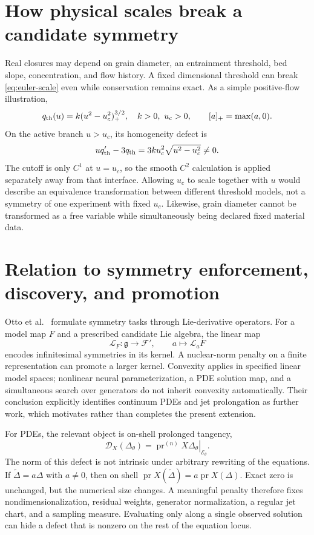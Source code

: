 \documentclass[11pt,a4paper,oneside]{report}
\numberwithin{equation}{chapter}
\newcommand{\E}{\mathcal E}
\newcommand{\pr}{\operatorname{pr}}
\begin{document}
\section{How physical scales break a candidate symmetry}
Real closures may depend on grain diameter, an entrainment threshold, bed slope, concentration, and flow history. A fixed dimensional threshold can break \eqref{eq:euler-scale} even while conservation remains exact. As a simple positive-flow illustration,
\begin{equation}\label{eq:threshold}
q_{\rm th}(u)=k(u^2-u_c^2)_+^{3/2},\quad k>0,\ u_c>0,
\qquad [a]_+=\max(a,0).
\end{equation}
On the active branch $u>u_c$, its homogeneity defect is
\begin{equation}
uq_{\rm th}'-3q_{\rm th}=3ku_c^2\sqrt{u^2-u_c^2}\ne0.
\end{equation}
The cutoff is only $C^1$ at $u=u_c$, so the smooth $C^2$ calculation is applied separately away from that interface. Allowing $u_c$ to scale together with $u$ would describe an equivalence transformation between different threshold models, not a symmetry of one experiment with fixed $u_c$. Likewise, grain diameter cannot be transformed as a free variable while simultaneously being declared fixed material data.

\section{Relation to symmetry enforcement, discovery, and promotion}
Otto et al.\ \cite{otto} formulate symmetry tasks through Lie-derivative operators. For a model map $F$ and a prescribed candidate Lie algebra, the linear map
\begin{equation}
\mathcal L_F:\mathfrak g\to\mathcal F',\qquad a\mapsto\mathcal L_aF
\end{equation}
encodes infinitesimal symmetries in its kernel. A nuclear-norm penalty on a finite representation can promote a larger kernel. Convexity applies in specified linear model spaces; nonlinear neural parameterization, a PDE solution map, and a simultaneous search over generators do not inherit convexity automatically. Their conclusion explicitly identifies continuum PDEs and jet prolongation as further work, which motivates rather than completes the present extension.

For PDEs, the relevant object is on-shell prolonged tangency,
\begin{equation}\label{eq:defectmodel}
\mathcal D_X(\Delta_\theta)=\left.\pr^{(n)}X\Delta_\theta\right|_{\E_\theta}.
\end{equation}
The norm of this defect is not intrinsic under arbitrary rewriting of the equations. If $\widetilde\Delta=a\Delta$ with $a\ne0$, then on shell $\pr X(\widetilde\Delta)=a\pr X(\Delta)$. Exact zero is unchanged, but the numerical size changes. A meaningful penalty therefore fixes nondimensionalization, residual weights, generator normalization, a regular jet chart, and a sampling measure. Evaluating only along a single observed solution can hide a defect that is nonzero on the rest of the equation locus.
\end{document}
